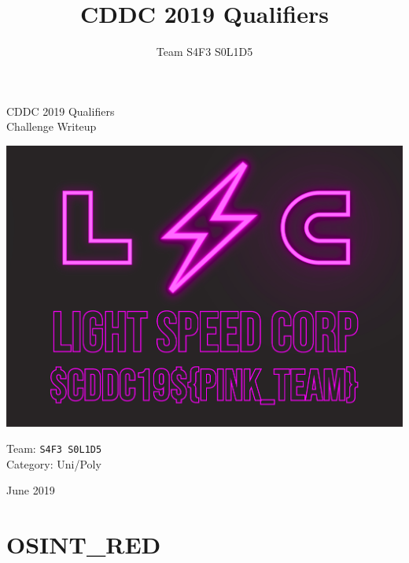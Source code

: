 \documentclass[12pt]{article}
\title{CDDC 2019 Qualifiers}
\author{Team S4F3 S0L1D5}
\begin{document}
\hypersetup{pageanchor=false}
\begin{center}

	\vspace*{5mm}

	\begin{flushleft}

	{
		\Roboto\fontsize{36pt}{48pt}\selectfont CDDC 2019 Qualifiers \\
		\Roboto\fontsize{28pt}{40pt}\selectfont Challenge Writeup

		\vspace{10mm}
		\begin{center}\includegraphics[width=150mm]{figures/osintblue/b0.png}\end{center}

		\vfill

		\normalfont\fontsize{20pt}{24pt}\selectfont Team:    \tabto{30mm} \fontsize{24pt}{24pt}\selectfont \texttt{S4F3 S0L1D5} \\
		\normalfont\fontsize{20pt}{24pt}\selectfont Category:\tabto{30mm} Uni/Poly

		\vspace{5mm}
		\normalfont\fontsize{16pt}{20pt}\selectfont June 2019
		\vspace{30mm}
	}

	\end{flushleft}


\end{center}


\pagebreak
{}
\hypersetup{pageanchor=true}


\pagebreak\part{OSINT\_RED}

\end{document}
